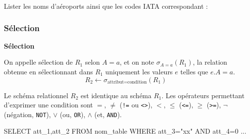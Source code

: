 \documentclass[10pt]{article}
\newif\ifprofvar
\begin{document}
\begin{exemple}
Lister les noms d'aéroports ainsi que les codes IATA correspondant :

\ifprofvar
$$
\pi_{\text{name,iata\_code}}(\text{airports})
$$

\begin{envsql}
\begin{sql}
SELECT name,iata_code FROM airports
\end{sql}
\end{envsql}
\else

\vspace{3cm}

\fi
\end{exemple}

\subsubsection{Sélection}
\begin{defi}
\textbf{Sélection}

On appelle sélection de $R_1$ selon $A=a$, et on note $\sigma_{A=a}(R_1)$, la relation obtenue en sélectionnant dans $R_1$ uniquement les valeurs $e$ telles que $e.A = a$.
$$
R_2 \leftarrow \sigma_{\text{attribut}=\text{condition}}(R_1)
$$

Le schéma relationnel $R_2$ est identique au schéma $R_1$.  Les opérateurs permettant d'exprimer une condition sont $=$, $\neq$ (\texttt{!=} ou \texttt{<>}), $<$, $\leq$ (\texttt{<=}), $\geq$ (\texttt{>=}), $\neg$ (négation, \texttt{NOT}), $\vee$ (ou, \texttt{OR}), $\wedge$ (et, \texttt{AND}).

\begin{envsql}
\begin{sql}
SELECT att_1,att_2 FROM nom_table WHERE att_3="xx" AND att_4=0 ...
\end{sql}
\end{envsql}

\end{defi}
\end{document}

